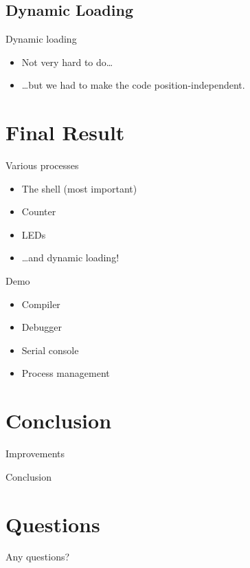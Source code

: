 \documentclass{beamer}
\begin{document}
    \subsection{Dynamic Loading}
      \begin{frame}{Dynamic loading}
        \begin{itemize}
          \item Not very hard to do\dots
          \item \dots but we had to make the code position-independent.
        \end{itemize}
      \end{frame}

  \section{Final Result}
    \begin{frame}{Various processes}
      \begin{itemize}
        \item The shell (most important)
        \item Counter
        \item LEDs
        \item \dots and dynamic loading!
      \end{itemize}
    \end{frame}

    \begin{frame}{Demo}
      \begin{itemize}
        \item Compiler
        \item Debugger
        \item Serial console
        \item Process management
      \end{itemize}
    \end{frame}

  \section{Conclusion}
    \begin{frame}{Improvements}
    \end{frame}

    \begin{frame}{Conclusion}
    \end{frame}

  \section{Questions}
    \begin{frame}
      Any questions?
    \end{frame}
\end{document}
